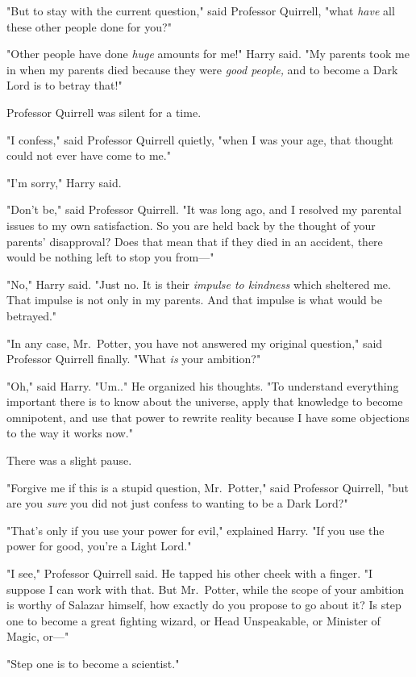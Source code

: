 "But to stay with the current question," said Professor Quirrell, "what 
\emph{have} all these other people done for you?"

"Other people have done \emph{huge} amounts for me!" Harry said. "My parents 
took me in when my parents died because they were \emph{good people,} and to 
become a Dark Lord is to betray that!"

Professor Quirrell was silent for a time.

"I confess," said Professor Quirrell quietly, "when I was your age, that 
thought could not ever have come to me."

"I'm sorry," Harry said.

"Don't be," said Professor Quirrell. "It was long ago, and I resolved my 
parental issues to my own satisfaction. So you are held back by the thought of 
your parents' disapproval? Does that mean that if they died in an accident, 
there would be nothing left to stop you from---"

"No," Harry said. "Just no. It is their \emph{impulse to kindness} which 
sheltered me. That impulse is not only in my parents. And that impulse is what 
would be betrayed."

"In any case, Mr.~Potter, you have not answered my original question," said 
Professor Quirrell finally. "What \emph{is} your ambition?"

"Oh," said Harry. "Um.." He organized his thoughts. "To understand everything 
important there is to know about the universe, apply that knowledge to become 
omnipotent, and use that power to rewrite reality because I have some 
objections to the way it works now."

There was a slight pause.

"Forgive me if this is a stupid question, Mr.~Potter," said Professor Quirrell, 
"but are you \emph{sure} you did not just confess to wanting to be a Dark Lord?"

"That's only if you use your power for evil," explained Harry. "If you use the 
power for good, you're a Light Lord."

"I see," Professor Quirrell said. He tapped his other cheek with a finger. "I 
suppose I can work with that. But Mr.~Potter, while the scope of your ambition 
is worthy of Salazar himself, how exactly do you propose to go about it? Is 
step one to become a great fighting wizard, or Head Unspeakable, or Minister of 
Magic, or---"

"Step one is to become a scientist."

